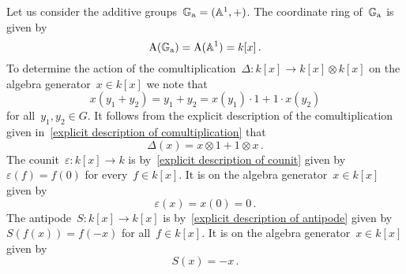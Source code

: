 \begin{example}
  Let us consider the additive groups~$\mathbb{G}_{\text{a}} = (\mathbb{A}^1, +)$.
  The coordinate ring of~$\mathbb{G}_{\text{a}}$ is given by
  \[
      \operatorname{A}(\mathbb{G}_{\text{a}})
    = \operatorname{A}(\mathbb{A}^1)
    = k[x] \,.
  \]
  To determine the action of the comultiplication~$\Delta \colon k[x] \to k[x] \otimes k[x]$ on the algebra generator~$x \in k[x]$ we note that
  \[
      x(y_1 + y_2)
    = y_1 + y_2
    = x(y_1) \cdot 1 + 1 \cdot x(y_2)
  \]
  for all~$y_1, y_2 \in G$.
  It follows from the explicit description of the comultiplication given in~\eqref{explicit description of comultiplication} that
  \[
      \Delta(x)
    = x \otimes 1 + 1 \otimes x \,.
  \]
  The counit~$\varepsilon \colon k[x] \to k$ is by~\eqref{explicit description of counit} given by~$\varepsilon(f) = f(0)$ for every~$f \in k[x]$.
  It is on the algebra generator~$x \in k[x]$ given by
  \[
      \varepsilon(x)
    = x(0)
    = 0 \,.
  \]
  The antipode~$S \colon k[x] \to k[x]$ is by~\eqref{explicit description of antipode} given by~$S(f(x)) = f(-x)$ for all~$f \in k[x]$.
  It is on the algebra generator~$x \in k[x]$ given by
  \[
      S(x)
    = -x \,.
  \]
\end{example}


